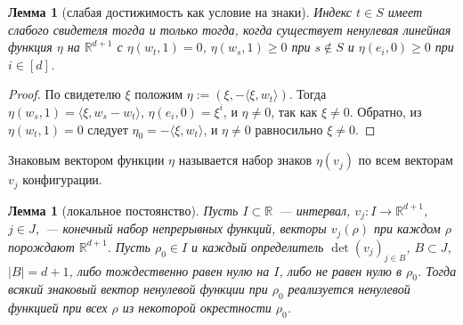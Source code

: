 \documentclass[a4paper,11pt]{article}
\theoremstyle{plain}
\newtheorem{lemma}[theorem]{Лемма}
\theoremstyle{definition}
\theoremstyle{remark}
\newcommand{\R}{\mathbb{R}}
\newcommand{\abs}[1]{\left\lvert #1 \right\rvert}
\newcommand{\ip}[2]{\langle #1, #2\rangle} %
\begin{document}
\begin{lemma}[слабая достижимость как условие на знаки]\label{lem:signs}
    Индекс $t\in S$ имеет слабого свидетеля тогда и только тогда, когда существует ненулевая линейная функция $\eta$ на $\R^{d+1}$ с $\eta(w_t,1)=0$, $\eta(w_s,1)\ge0$ при $s\notin S$ и $\eta(e_i,0)\ge0$ при $i\in[d]$.
\end{lemma}

\begin{proof}
    По свидетелю $\xi$ положим $\eta:=(\xi,-\ip{\xi}{w_t})$. Тогда $\eta(w_s,1)=\ip{\xi}{w_s-w_t}$, $\eta(e_i,0)=\xi^i$, и $\eta\ne0$, так как $\xi\ne0$. Обратно, из $\eta(w_t,1)=0$ следует $\eta_0=-\ip{\xi}{w_t}$, и $\eta\ne0$ равносильно $\xi\ne0$.
\end{proof}

Знаковым вектором функции $\eta$ называется набор знаков $\eta(v_j)$ по всем векторам $v_j$ конфигурации.

\begin{lemma}[локальное постоянство]\label{lem:local}
    Пусть $I\subset\R$~--- интервал, $v_j:I\to\R^{d+1}$, $j\in J$,~--- конечный набор непрерывных функций, векторы $v_j(\rho)$ при каждом $\rho$ порождают $\R^{d+1}$. Пусть $\rho_0\in I$ и каждый определитель $\det(v_j)_{j\in B}$, $B\subset J$, $\abs{B}=d+1$, либо тождественно равен нулю на $I$, либо не равен нулю в $\rho_0$. Тогда всякий знаковый вектор ненулевой функции при $\rho_0$ реализуется ненулевой функцией при всех $\rho$ из некоторой окрестности $\rho_0$.
\end{lemma}
\end{document}
